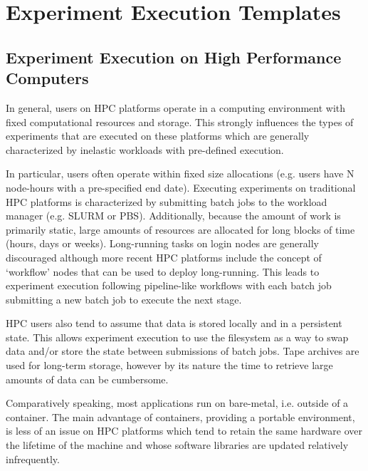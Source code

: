 \documentclass[utf8]{FrontiersinVancouver} %
\begin{document}
\section{Experiment Execution Templates}



\subsection{Experiment Execution on High Performance Computers}

In general, users on HPC platforms operate in a computing environment with fixed computational resources and storage. This strongly influences the types of experiments that are executed on these platforms which are generally characterized by inelastic workloads with pre-defined execution.

In particular, users often operate within fixed size allocations (e.g. users have N node-hours with a pre-specified end date). Executing experiments on traditional HPC platforms is characterized by submitting batch jobs to the workload manager (e.g. SLURM or PBS). Additionally, because the amount of work is primarily static, large amounts of resources are allocated for long blocks of time (hours, days or weeks). Long-running tasks on login nodes are generally discouraged although more recent HPC platforms include the concept of `workflow' nodes that can be used to deploy long-running. This leads to experiment execution following pipeline-like workflows with each batch job submitting a new batch job to execute the next stage.

HPC users also tend to assume that data is stored locally and in a persistent state. This allows experiment execution to use the filesystem as a way to swap data and/or store the state between submissions of batch jobs. Tape archives are used for long-term storage, however by its nature the time to retrieve large amounts of data can be cumbersome.

Comparatively speaking, most applications run on bare-metal, i.e. outside of a container. The main advantage of containers, providing a portable environment, is less of an issue on HPC platforms which tend to retain the same hardware over the lifetime of the machine and whose software libraries are updated relatively infrequently.
\end{document}

